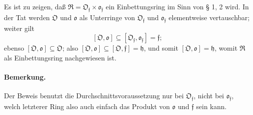 Es ist zu zeigen, daß $\mathfrak R=\mathfrak O_{\mathfrak f}\times\mathfrak o_{\mathfrak f}$ ein Einbettungsring im Sinn von § 1, 2 wird. In der Tat werden $\mathfrak O$ und $\mathfrak o$ als Unterringe von $\mathfrak O_{\mathfrak f}$ und $\mathfrak o_{\mathfrak f}$ elementweise vertauschbar; weiter gilt
\[
[\mathfrak O,\mathfrak o]\subseteq[\mathfrak O_{\mathfrak f},\mathfrak o_{\mathfrak f}]=\mathfrak f;
\]
ebenso $[\mathfrak O,\mathfrak o]\subseteq\mathfrak O$; also $[\mathfrak O,\mathfrak o]\subseteq[\mathfrak O,\mathfrak f]=\mathfrak h$, und somit $[\mathfrak O,\mathfrak o]=\mathfrak h$, womit $\mathfrak R$ als Einbettungsring nachgewiesen ist.

\paragraph{Bemerkung.}
Der Beweis benutzt die Durchschnittsvoraussetzung nur bei $\mathfrak O_{\mathfrak f}$, nicht bei $\mathfrak o_{\mathfrak f}$, welch letzterer Ring also auch einfach das Produkt von $\mathfrak o$ und $\mathfrak f$ sein kann.

